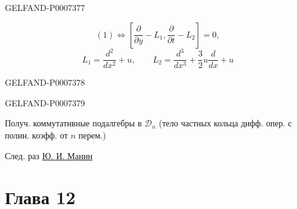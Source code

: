 \begin{GelfandAdjacentEvidence}{GELFAND-P000737}{7}


\[
(1)\Longleftrightarrow
\left[\frac{\partial}{\partial y}-L_1,\frac{\partial}{\partial t}-L_2\right]=0,
\]
\[
L_1=\frac{d^2}{dx^2}+u,\qquad
L_2=\frac{d^3}{dx^3}+\frac32u\frac{d}{dx}+u
\]
\end{GelfandAdjacentEvidence}
\begin{GelfandAdjacentEvidence}{GELFAND-P000737}{8}

\end{GelfandAdjacentEvidence}
\begin{GelfandAdjacentEvidence}{GELFAND-P000737}{9}


Получ. коммутативные подалгебры в \(\mathcal D_n\) (тело частных кольца дифф. опер. с полин. коэфф. от \(n\) перем.)

След. раз \underline{Ю. И. Манин}
\end{GelfandAdjacentEvidence}



\clearpage{}
\section*{Глава 12}



